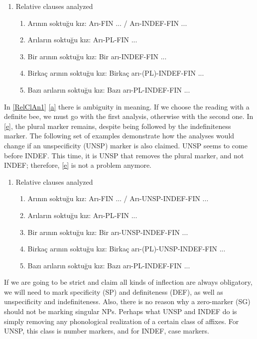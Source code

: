 \documentclass[11pt]{article} %
\begin{document}
\begin{enumerate}[resume*] 
	\item Relative clauses analyzed \label{RelClAn1}
	\begin{enumerate}[label=(\alph*), ref=(\alph*)]\itemsep1pt
	\item Arının soktuğu kız: Arı-FIN ... / Arı-INDEF-FIN ... \label{a}
	\item Arıların soktuğu kız: Arı-PL-FIN ... \label{b}
	\item Bir arının soktuğu kız: Bir arı-INDEF-FIN ... \label{c}
	\item Birkaç arının soktuğu kız: Birkaç arı-(PL)-INDEF-FIN ... \label{d}
	\item Bazı arıların soktuğu kız: Bazı arı-PL-INDEF-FIN ... \label{e}
	\end{enumerate}
\end{enumerate}

In \ref{RelClAn1} \ref{a} there is ambiguity in meaning. If we choose the reading with a definite bee, we must go with the first analysis, otherwise with the second one. In \ref{e}, the plural marker remains, despite being followed by the indefiniteness marker. The following set of examples demonstrate how the analyses would change if an unspecificity (UNSP) marker is also claimed. UNSP seems to come before INDEF. This time, it is UNSP that removes the plural marker, and not INDEF; therefore, \ref{e} is not a problem anymore. 

\begin{enumerate}[resume*] 
	\item Relative clauses analyzed \label{RelClAn2}
	\begin{enumerate}[label=(\alph*), ref=(\alph*)]\itemsep1pt
	\item Arının soktuğu kız: Arı-FIN ... / Arı-UNSP-INDEF-FIN ... \label{a}
	\item Arıların soktuğu kız: Arı-PL-FIN ... \label{b}
	\item Bir arının soktuğu kız: Bir arı-UNSP-INDEF-FIN ... \label{c}
	\item Birkaç arının soktuğu kız: Birkaç arı-(PL)-UNSP-INDEF-FIN ... \label{d}
	\item Bazı arıların soktuğu kız: Bazı arı-PL-INDEF-FIN ... \label{e}
	\end{enumerate}
\end{enumerate}

If we are going to be strict and claim all kinds of inflection are always obligatory, we will need to mark specificity (SP) and definiteness (DEF), as well as unspecificity and indefiniteness. Also, there is no reason why a zero-marker (SG) should not be marking singular NPs. Perhaps what UNSP and INDEF do is simply removing any phonological realization of a certain class of affixes. For UNSP, this class is number markers, and for INDEF, case markers.
\end{document}
